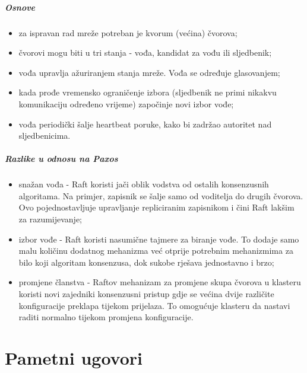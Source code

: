 \documentclass[times, utf8, diplomski]{fer}
\begin{document}
\subparagraph{Osnove}

\begin{itemize}

\item za ispravan rad mreže potreban je kvorum (većina) čvorova;

\item čvorovi mogu biti u tri stanja - vođa, kandidat za vođu ili sljedbenik;

\item vođa upravlja ažuriranjem stanja mreže. Vođa se određuje glasovanjem;

\item kada prođe vremensko ograničenje izbora (sljedbenik ne primi nikakvu komunikaciju određeno vrijeme) započinje novi izbor vođe;

\item vođa periodički šalje heartbeat poruke, kako bi zadržao autoritet nad sljedbenicima.

\end{itemize}

\subparagraph{Razlike u odnosu na Paxos}

\begin{itemize}

\item snažan vođa - Raft koristi jači oblik vodstva od ostalih konsenzusnih algoritama. Na primjer, zapisnik se šalje samo od voditelja do drugih čvorova. Ovo pojednostavljuje upravljanje repliciranim zapisnikom i čini Raft lakšim za razumijevanje;

\item izbor vođe - Raft koristi nasumične tajmere za biranje vođe. To dodaje samo malu količinu dodatnog mehanizma već otprije potrebnim mehanizmima za bilo koji algoritam konsenzusa, dok sukobe rješava jednostavno i brzo;

\item promjene članstva - Raftov mehanizam za promjene skupa čvorova u klasteru koristi novi zajedniki konsenzusni pristup gdje se većina dvije različite konfiguracije preklapa tijekom prijelaza. To omogućuje klasteru da nastavi raditi normalno tijekom promjena konfiguracije.

\end{itemize}

\section{Pametni ugovori}
\end{document}
